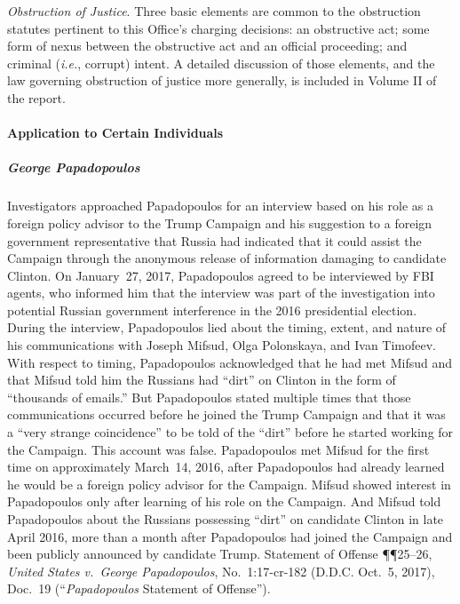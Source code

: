 \textit{Obstruction of Justice}.
Three basic elements are common to the obstruction statutes pertinent to this Office's charging decisions: an obstructive act; some form of nexus between the obstructive act and an official proceeding; and criminal (\textit{i.e.}, corrupt) intent.
A detailed discussion of those elements, and the law governing obstruction of justice more generally, is included in Volume II of the report.

\paragraph{Application to Certain Individuals}

\subparagraph{George Papadopoulos}
Investigators approached Papadopoulos for an interview based on his role as a foreign policy advisor to the Trump Campaign and his suggestion to a foreign government representative that Russia had indicated that it could assist the Campaign through the anonymous release of information damaging to candidate Clinton.
On January~27, 2017, Papadopoulos agreed to be interviewed by FBI agents, who informed him that the interview was part of the investigation into potential Russian government interference in the 2016 presidential election.
During the interview, Papadopoulos lied about the timing, extent, and nature of his communications with Joseph Mifsud, Olga Polonskaya, and Ivan Timofeev.
With respect to timing, Papadopoulos acknowledged that he had met Mifsud and that Mifsud told him the Russians had ``dirt'' on Clinton in the form of ``thousands of emails.''
But Papadopoulos stated multiple times that those communications occurred before he joined the Trump Campaign and that it was a ``very strange coincidence'' to be told of the ``dirt'' before he started working for the Campaign.
This account was false.
Papadopoulos met Mifsud for the first time on approximately March~14, 2016, after Papadopoulos had already learned he would be a foreign policy advisor for the Campaign.
Mifsud showed interest in Papadopoulos only after learning of his role on the Campaign.
And Mifsud told Papadopoulos about the Russians possessing ``dirt'' on candidate Clinton in late April 2016, more than a month after Papadopoulos had joined the Campaign and been publicly announced by candidate Trump.
Statement of Offense \P\P 25--26, \textit{United States v.\ George Papadopoulos}, No.~1:17-cr-182 (D.D.C. Oct.~5, 2017), Doc.~19 (``\textit{Papadopoulos} Statement of Offense'').

